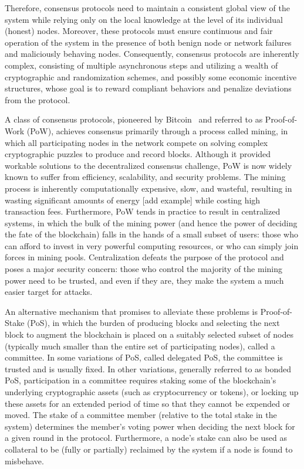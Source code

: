 Therefore, consensus protocols need to maintain a consistent global view of the system while relying only on the local knowledge at the level of its individual (honest) nodes. Moreover, these protocols must ensure continuous and fair operation of the system in the presence of both benign node or network failures and maliciously behaving nodes. Consequently, consensus protocols are inherently complex, consisting of multiple asynchronous steps and utilizing a wealth of cryptographic and randomization schemes, and possibly some economic incentive structures, whose goal is to reward compliant behaviors and penalize deviations from the protocol.

A class of consensus protocols, pioneered by Bitcoin~\cite{Nakamoto2008} and referred to as Proof-of-Work (PoW), achieves consensus primarily through a process called mining, in which all participating nodes in the network compete on solving complex cryptographic puzzles to produce and record blocks. Although it provided workable solutions to the decentralized consensus challenge, PoW is now widely known to suffer from efficiency, scalability, and security problems. The mining process is inherently computationally expensive, slow, and wasteful, resulting in wasting significant amounts of energy [add example] while costing high transaction fees. Furthermore, PoW tends in practice to result in centralized systems, in which the bulk of the mining power (and hence the power of deciding the fate of the blockchain) falls in the hands of a small subset of users: those who can afford to invest in very powerful computing resources, or who can simply join forces in mining pools. Centralization defeats the purpose of the protocol and poses a major security concern: those who control the majority of the mining power need to be trusted, and even if they are, they make the system a much easier target for attacks.

An alternative mechanism that promises to alleviate these problems is Proof-of-Stake (PoS), in which the burden of producing blocks and selecting the next block to augment the blockchain is placed on a suitably selected subset of nodes (typically much smaller than the entire set of participating nodes), called a committee. In some variations of PoS, called delegated PoS, the committee is trusted and is usually fixed. In other variations, generally referred to as bonded PoS, participation in a committee requires staking some of the blockchain's underlying cryptographic assets (such as cryptocurrency or tokens), or locking up these assets for an extended period of time so that they cannot be expended or moved. The stake of a committee member (relative to the total stake in the system) determines the member's voting power when deciding the next block for a given round in the protocol. Furthermore, a node's stake can also be used as collateral to be (fully or partially) reclaimed by the system if a node is found to misbehave.

